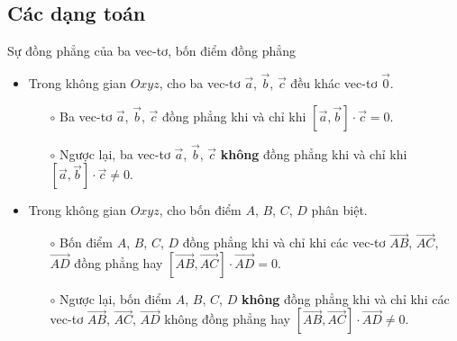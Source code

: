 \subsection{Các dạng toán}
\begin{dang}{Sự đồng phẳng của ba vec-tơ{,} bốn điểm đồng phẳng}
	\begin{itemize}
		\item Trong không gian $Oxyz$, cho ba vec-tơ $\overrightarrow{a}$, $\overrightarrow{b}$, $\overrightarrow{c}$ đều khác vec-tơ $\overrightarrow{0}$.
		\begin{itemize}
			\item[$\circ$] Ba vec-tơ $\overrightarrow{a}$, $\overrightarrow{b}$, $\overrightarrow{c}$ đồng phẳng khi và chỉ khi $\left[ \overrightarrow{a}, \overrightarrow{b} \right] \cdot \overrightarrow{c} = 0$.
			\item[$\circ$] Ngược lại, ba vec-tơ $\overrightarrow{a}$, $\overrightarrow{b}$, $\overrightarrow{c}$ \textbf{không} đồng phẳng khi và chỉ khi $\left[ \overrightarrow{a}, \overrightarrow{b} \right]\cdot \overrightarrow{c} \neq 0$.
		\end{itemize}
		
		\item Trong không gian $Oxyz$, cho bốn điểm $A$, $B$, $C$, $D$ phân biệt.
		\begin{itemize}
			\item[$\circ$] Bốn điểm $A$, $B$, $C$, $D$ đồng phẳng khi và chỉ khi các vec-tơ $\overrightarrow{AB}$, $\overrightarrow{AC}$, $\overrightarrow{AD}$ đồng phẳng hay $\left[ \overrightarrow{AB}, \overrightarrow{AC} \right] \cdot \overrightarrow{AD} = 0$.
			\item[$\circ$] Ngược lại, bốn điểm $A$, $B$, $C$, $D$ \textbf{không} đồng phẳng khi và chỉ khi các vec-tơ $\overrightarrow{AB}$, $\overrightarrow{AC}$, $\overrightarrow{AD}$ không đồng phẳng hay $\left[ \overrightarrow{AB}, \overrightarrow{AC} \right] \cdot \overrightarrow{AD} \neq 0$.
		\end{itemize}
	\end{itemize}
	
\end{dang}




